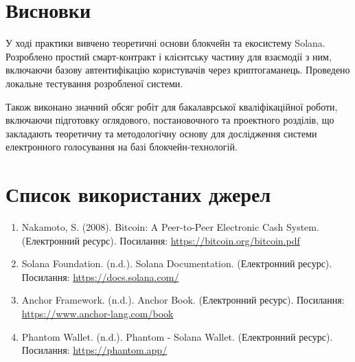 \documentclass[14pt]{extreport}
\begin{document}
\section*{Висновки}

У ході практики вивчено теоретичні основи блокчейн та екосистему Solana. Розроблено простий смарт-контракт і клієнтську частину для взаємодії з ним, включаючи базову автентифікацію користувачів через криптогаманець. Проведено локальне тестування розробленої системи.

Також виконано значний обсяг робіт для бакалаврської кваліфікаційної роботи, включаючи підготовку оглядового, постановочного та проектного розділів, що закладають теоретичну та методологічну основу для дослідження системи електронного голосування на базі блокчейн-технологій.

\newpage
\section*{Список використаних джерел}

\begin{enumerate}
\item Nakamoto, S. (2008). Bitcoin: A Peer-to-Peer Electronic Cash System. (Електронний ресурс). Посилання: \href{https://bitcoin.org/bitcoin.pdf}{https://bitcoin.org/bitcoin.pdf}
\item Solana Foundation. (n.d.). Solana Documentation. (Електронний ресурс). Посилання: \href{https://docs.solana.com/}{https://docs.solana.com/}
\item Anchor Framework. (n.d.). Anchor Book. (Електронний ресурс). Посилання: \href{https://www.anchor-lang.com/book}{https://www.anchor-lang.com/book}
\item Phantom Wallet. (n.d.). Phantom - Solana Wallet. (Електронний ресурс). Посилання: \href{https://phantom.app/}{https://phantom.app/}

\end{enumerate}

\newpage
\end{document}
